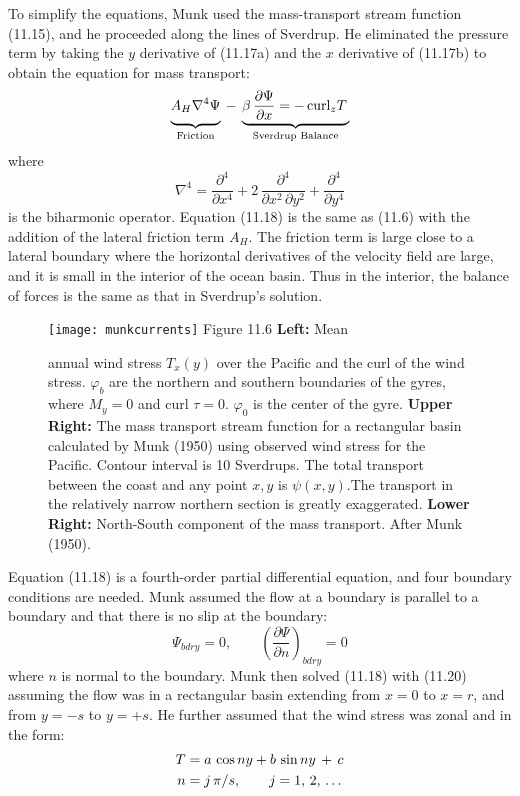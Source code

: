 To simplify the equations, Munk used the mass-transport stream function (11.15), and he proceeded along the lines of Sverdrup. He eliminated the pressure
term by taking the $y$ derivative of (11.17a) and the $x$ derivative of (11.17b) to obtain
the equation for mass transport:
\begin{equation}
\underbrace{A_H \nabla^{4}
\Psi\vphantom{\frac{\partial\Psi}{\partial{x}}}}_{\text{Friction}}\:-\:\underbrace{\beta\,\frac{\partial\Psi}{\partial{x}} =-\,\text{curl}_z T
\,}_{\text{Sverdrup Balance}}
\end{equation}
where
\begin{equation}
\nabla^4 =\frac{\partial^4}{\partial{x}^4}+2\,\frac{\partial^4}{\partial{x}^2
\,\partial{y}^2} + \frac{\partial^4}{\partial{y}^4}
\end{equation}
is the biharmonic operator. Equation (11.18) is the same as (11.6)  with the
addition of the lateral friction term $A_H$. The friction term is large
close to a lateral boundary where the horizontal derivatives of the velocity
field are large, and it is small in the interior of the ocean basin. Thus in the
interior, the balance of forces is the same as that in Sverdrup's solution.

\begin{figure}[t!]
\texttt{[image: munkcurrents]}
\footnotesize
Figure 11.6 \textbf{Left:} Mean \rule{0mm}{4ex}annual wind stress
$T_x (y)$ over the Pacific and the curl of the wind stress. $\varphi _b$ are the
northern and southern boundaries of the gyres, where $M_y = 0$ and curl $\tau = 0$.
$\varphi _0$ is the center of the gyre.
\textbf{Upper Right:} The mass transport stream function for a
rectangular basin calculated by Munk (1950) using observed wind stress for the Pacific. Contour
interval is 10 Sverdrups. The total transport between the coast and any point
$x,y$ is $\psi (x,y)$.The transport in the relatively narrow northern section is
greatly exaggerated.  \textbf{Lower Right:} North-South component of the mass
transport. After Munk (1950).
\label{fig:munkcurrents}
\vspace{-3ex}
\end{figure}

Equation (11.18) is a fourth-order partial differential equation, and four
boundary conditions are needed. Munk assumed the flow at a boundary is parallel
to a boundary and that there is no slip at the boundary:
\begin{equation}
\Psi_{bdry} = 0, \qquad \left(\frac{\partial{\Psi}}{\partial{n}}\right)_{bdry} = 0
\end{equation}
where $n$ is normal to the boundary. Munk then solved (11.18) with (11.20)
assuming the flow was in a rectangular basin extending from $x = 0$ to
$x = r$, and from $y = -s$ to $y = +s$. He further assumed that the wind
stress was zonal and in the form:
\begin{align}
T&=a\,\cos ny + b\,\sin ny \,+\, c  \notag \\
n&=j\,\pi/s, \qquad j=1,\,2,\,\dots
\end{align}

